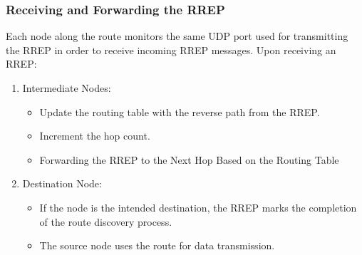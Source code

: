 \documentclass[]{nsm-thesis}
\begin{document}
\subsubsection{Receiving and Forwarding the RREP}
Each node along the route monitors the same UDP port used for transmitting the RREP in order to receive incoming RREP messages. Upon receiving an RREP:
\begin{enumerate}
    \item Intermediate Nodes:
    \begin{itemize}
        \item Update the routing table with the reverse path from the RREP.
        \item  Increment the hop count.
        \item Forwarding the RREP to the Next Hop Based on the Routing Table
    \end{itemize}
    \item Destination Node:
    \begin{itemize}
        \item If the node is the intended destination, the RREP marks the completion of the route discovery process.
        \item The source node uses the route for data transmission.
    \end{itemize}
    
\end{enumerate}
\end{document}

